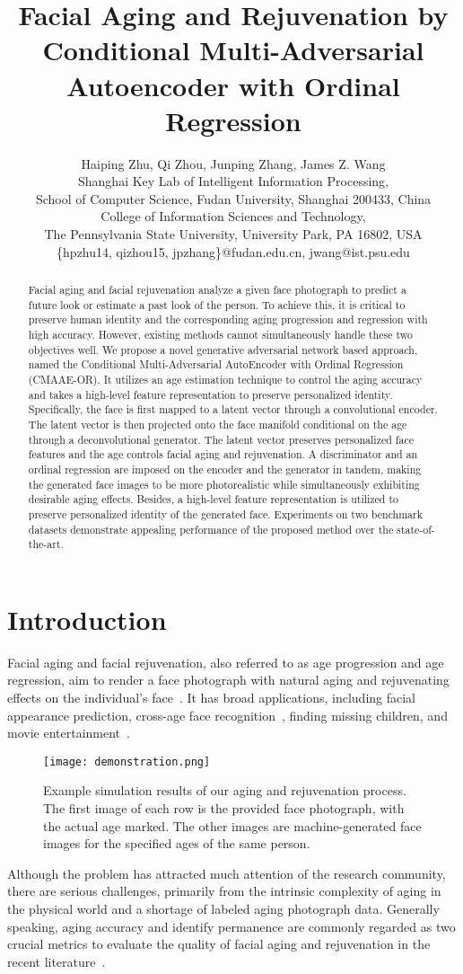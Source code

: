 \documentclass{article}
\title{Facial Aging and Rejuvenation by Conditional Multi-Adversarial Autoencoder with Ordinal Regression}
\author{
Haiping Zhu,
Qi Zhou,
Junping Zhang,
James Z. Wang
\\ 
 Shanghai Key Lab of Intelligent Information Processing, \\
School of Computer Science, Fudan University, Shanghai 200433, China \\
 College of Information Sciences and Technology, \\
The Pennsylvania State University, University Park, PA 16802, USA \\
\{hpzhu14, qizhou15, jpzhang\}@fudan.edu.cn,
jwang@ist.psu.edu
}
\begin{document}
\maketitle
\begin{abstract}
Facial aging and facial rejuvenation analyze a given face photograph to predict a future look or estimate a past look of the person. To achieve this, it is critical to preserve human identity and the corresponding aging progression and regression with high accuracy. However, existing methods cannot simultaneously handle these two objectives well. We propose a novel generative adversarial network based approach, named the Conditional Multi-Adversarial AutoEncoder with Ordinal Regression (CMAAE-OR). It utilizes an age estimation technique to control the aging accuracy and takes a high-level feature representation to preserve personalized identity. Specifically, the face is first mapped to a latent vector through a convolutional encoder. The latent vector is then projected onto the face manifold conditional on the age through a deconvolutional generator. The latent vector preserves personalized face features and the age controls facial aging and rejuvenation. A discriminator and an ordinal regression are imposed on the encoder and the generator in tandem, making the generated face images to be more photorealistic while simultaneously exhibiting desirable aging effects. Besides, a high-level feature representation is utilized to preserve personalized identity of the generated face.  Experiments on two benchmark datasets demonstrate appealing performance of the proposed method over the state-of-the-art.
\end{abstract}

\section{Introduction}\label{intro}
Facial aging and facial rejuvenation, also referred to as age progression and age regression, aim to render a face photograph with natural aging and rejuvenating effects on the individual's face~\cite{fu2010age}. It has broad applications, including facial appearance prediction, cross-age face recognition~\cite{park2010age}, finding missing children, and movie entertainment~\cite{wang2016recurrent}.
\begin{figure}[!ht]
\centering
\texttt{[image: demonstration.png]}
\caption{Example simulation results of our aging and rejuvenation process. The first image of each row is the provided face photograph, with the actual age marked. The other images are machine-generated face images for the specified ages of the same person.
}
\label{demonstration}
\end{figure}
Although the problem has attracted much attention of the research community, there are serious challenges, primarily from the intrinsic complexity of aging in the physical world and a shortage of labeled aging photograph data. Generally speaking, aging accuracy and identify permanence are commonly regarded as two crucial metrics to evaluate the quality of facial aging and rejuvenation in the recent literature~\cite{shu2015personalized,suo2010compositional,yang2016face}. 
\end{document}
